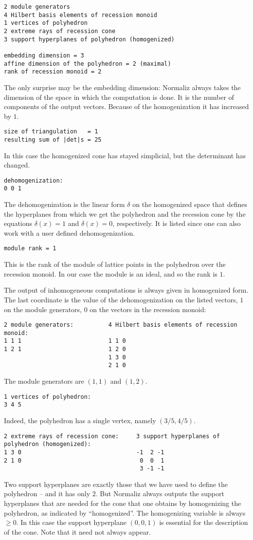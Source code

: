 \documentclass[12pt,a4paper]{scrartcl}
\theoremstyle{definition}
\begin{document}
\begin{Verbatim}
2 module generators
4 Hilbert basis elements of recession monoid
1 vertices of polyhedron
2 extreme rays of recession cone
3 support hyperplanes of polyhedron (homogenized)

embedding dimension = 3
affine dimension of the polyhedron = 2 (maximal)
rank of recession monoid = 2
\end{Verbatim}
The only surprise may be the embedding dimension: Normaliz always takes the dimension of the space in which the computation is done. It is the number of components of the output vectors. Because of the homogenization it has increased by $1$.
\begin{Verbatim}
size of triangulation   = 1
resulting sum of |det|s = 25
\end{Verbatim}
In this case the homogenized cone has stayed simplicial, but the determinant has changed.
\begin{Verbatim}
dehomogenization:
0 0 1
\end{Verbatim}
The dehomogenization is the linear form $\delta$ on the homogenized space that defines the hyperplanes from which we get the polyhedron and the recession cone by the equations $\delta(x)=1$ and $\delta(x)=0$, respectively. It is listed since one can also work with a user defined dehomogenization.
\begin{Verbatim}
module rank = 1
\end{Verbatim}
This is the rank of the module of lattice points in the polyhedron over the recession monoid. In our case the module is an ideal, and so the rank is $1$.

The output of inhomogeneous computations is always given in homogenized form. The last coordinate is the value of the dehomogenization on the listed vectors, $1$ on the module generators, $0$ on the vectors in the recession monoid:
\begin{Verbatim}
2 module generators:          4 Hilbert basis elements of recession monoid:
1 1 1                         1 1 0
1 2 1                         1 2 0
                              1 3 0
                              2 1 0
\end{Verbatim}
The module generators are $(1,1)$ and $(1,2)$.
\begin{Verbatim}
1 vertices of polyhedron:
3 4 5
\end{Verbatim}
Indeed, the polyhedron has a single vertex, namely $(3/5,4/5)$.
\begin{Verbatim}
2 extreme rays of recession cone:     3 support hyperplanes of polyhedron (homogenized):
1 3 0                                 -1  2 -1
2 1 0                                  0  0  1
                                       3 -1 -1
\end{Verbatim}
Two support hyperplanes are exactly those that we have used to define the polyhedron -- and it has only $2$. But Normaliz always outputs the support hyperplanes that are needed for the cone that one obtains by homogenizing the polyhedron, as indicated by ``homogenized''. The homogenizing variable is always $\ge 0$. In this case the support hyperplane $(0,0,1)$ is essential for the description of the cone. Note that it need not always appear.
\end{document}
